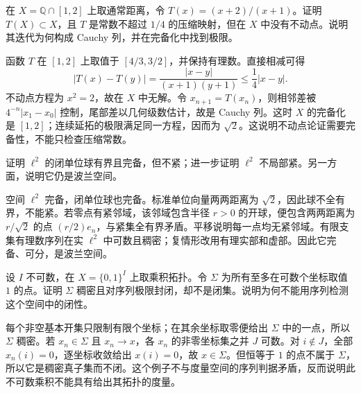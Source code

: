 \BookExercises

\begin{exercise}\label{b1:ex:A1-contraction}
在 \(X=\mathbb Q\cap[1,2]\) 上取通常距离，令 \(T(x)=(x+2)/(x+1)\)。证明 \(T(X)\subset X\)，且 \(T\) 是常数不超过 \(1/4\) 的压缩映射，但在 \(X\) 中没有不动点。说明其迭代为何构成 Cauchy 列，并在完备化中找到极限。
\end{exercise}
\begin{solution}
函数 \(T\) 在 \([1,2]\) 上取值于 \([4/3,3/2]\)，并保持有理数。直接相减可得
\[
 |T(x)-T(y)|=\frac{|x-y|}{(x+1)(y+1)}\le\frac14|x-y|.
\]
不动点方程为 \(x^2=2\)，故在 \(X\) 中无解。令 \(x_{n+1}=T(x_n)\)，则相邻差被 \(4^{-n}|x_1-x_0|\) 控制，尾部差以几何级数估计，故是 Cauchy 列。这时 \(X\) 的完备化是 \([1,2]\)；连续延拓的极限满足同一方程，因而为 \(\sqrt2\)。这说明不动点论证需要完备性，不能只检查压缩常数。
\end{solution}

\begin{exercise}\label{b1:ex:A1-l2-local}
证明 \(\ell^2\) 的闭单位球有界且完备，但不紧；进一步证明 \(\ell^2\) 不局部紧。另一方面，说明它仍是波兰空间。
\end{exercise}
\begin{solution}
空间 \(\ell^2\) 完备，闭单位球也完备。标准单位向量两两距离为 \(\sqrt2\)，因此球不全有界，不能紧。若零点有紧邻域，该邻域包含半径 \(r>0\) 的开球，便包含两两距离为 \(r/\sqrt2\) 的点 \((r/2)e_n\)，与紧集全有界矛盾。平移说明每一点均无紧邻域。有限支集有理数序列在实 \(\ell^2\) 中可数且稠密；复情形改用有理实部和虚部。因此它完备、可分，是波兰空间。
\end{solution}

\begin{exercise}\label{b1:ex:A1-product-sequences}
设 \(I\) 不可数，在 \(X=\{0,1\}^I\) 上取乘积拓扑。令 \(\Sigma\) 为所有至多在可数个坐标取值 \(1\) 的点。证明 \(\Sigma\) 稠密且对序列极限封闭，却不是闭集。说明为何不能用序列检测这个空间中的闭性。
\end{exercise}
\begin{solution}
每个非空基本开集只限制有限个坐标；在其余坐标取零便给出 \(\Sigma\) 中的一点，所以 \(\Sigma\) 稠密。若 \(x_n\in\Sigma\) 且 \(x_n\rightarrow x\)，各 \(x_n\) 的非零坐标集之并 \(J\) 可数。对 \(i\notin J\)，全部 \(x_n(i)=0\)，逐坐标收敛给出 \(x(i)=0\)，故 \(x\in\Sigma\)。但恒等于 \(1\) 的点不属于 \(\Sigma\)，所以它是稠密真子集而不闭。这个例子不与度量空间的序列判据矛盾，反而说明此不可数乘积不能具有给出其拓扑的度量。
\end{solution}

